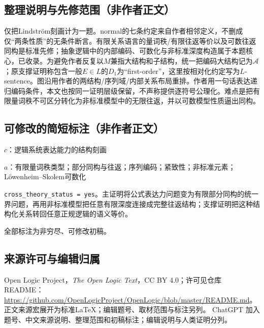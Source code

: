 \documentclass[UTF8,11pt]{ctexart}
\theoremstyle{definition}
\begin{document}
\subsection*{整理说明与先修范围（非作者正文）}
仅把Lindstr\"om刻画计为一题。normal的七条约定来自作者相邻定义，不删成仅“两条性质”的无条件断言。有限关系语言的量词秩/有限往返等价以及可数往返同构是标准先修；抽象逻辑中的内部编码、可数化与非标准深度构造属于本题核心，已收录。为避免作者反复以$M$兼指大结构和子结构，统一把编码大结构记为$\mathcal A$；原支撑证明称包含一般$E\in L$的$D_1$为“first-order”，这里按相对化约定写为$L$-sentence。图沿用作者的两结构/序列域/内部关系布局重排。作者用一句话表达递归编码条件，本文也按同一证明层级保留，不声称提供逐符号公理化。难点是把有限量词秩不可区分转化为非标准模型中的无限往返，并以可数模型性质逼出同构。
\subsection*{可修改的简短标注（非作者正文）}
$c$：逻辑系统表达能力的结构刻画

$a$：有限量词秩类型；部分同构与往返；序列编码；紧致性；非标准元素；Löwenheim--Skolem可数化

\texttt{cross\_theory\_status = yes}。主证明将公式表达力问题变为有限部分同构的统一界问题，再用非标准模型把任意有限深度连接成完整往返结构；支撑证明把这种结构化关系转回任意正规逻辑的语义等价。

全部标注为非穷尽、可修改初稿。
\subsection*{来源许可与编辑归属}
Open Logic Project，\emph{The Open Logic Text}，CC BY 4.0；许可见仓库README：\url{https://github.com/OpenLogicProject/OpenLogic/blob/master/README.md}。正文来源宏展开为标准LaTeX；编辑题号、取材范围与标注另列。
ChatGPT 加入题号、中文来源说明、整理范围和初稿标注；编辑说明与人类证明分列。
\end{document}
